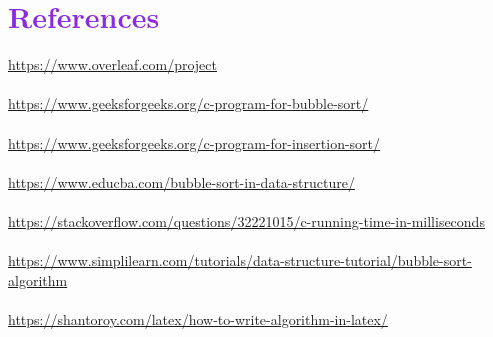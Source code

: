 \documentclass{article}
\begin{document}
\section{\textcolor{BlueViolet}{References}}\label{sec_ed}
\url{https://www.overleaf.com/project}\\\\
\url{https://www.geeksforgeeks.org/c-program-for-bubble-sort/}\\\\
\url{https://www.geeksforgeeks.org/c-program-for-insertion-sort/}\\\\
\url{https://www.educba.com/bubble-sort-in-data-structure/}\\\\
\url{https://stackoverflow.com/questions/32221015/c-running-time-in-milliseconds}\\\\
\url{https://www.simplilearn.com/tutorials/data-structure-tutorial/bubble-sort-algorithm}\\\\
\url{https://shantoroy.com/latex/how-to-write-algorithm-in-latex/}\\\\
\end{document}

